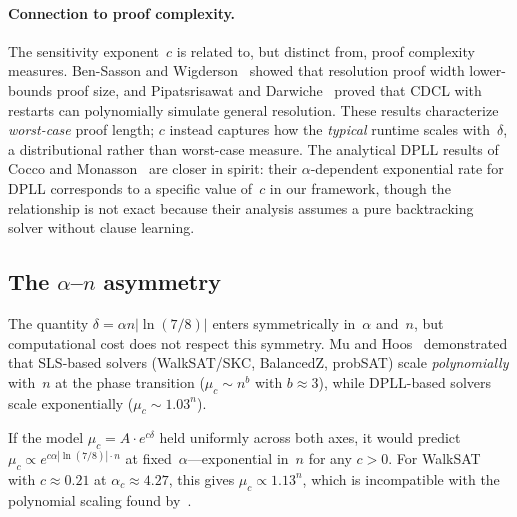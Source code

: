 \documentclass[11pt,a4paper]{article}
\newcommand{\mc}{\mu_c}
\begin{document}
\paragraph{Connection to proof complexity.}
The sensitivity exponent~$c$ is related to, but distinct from,
proof complexity measures.
Ben-Sasson and Wigderson~\cite{BenSasson2001} showed that
resolution proof width lower-bounds proof size,
and Pipatsrisawat and Darwiche~\cite{Pipatsrisawat2011}
proved that CDCL with restarts can polynomially simulate
general resolution.
These results characterize \emph{worst-case} proof length;
$c$ instead captures how the \emph{typical} runtime scales
with~$\delta$, a distributional rather than worst-case measure.
The analytical DPLL results of Cocco and
Monasson~\cite{CoccoMonasson2001} are closer in spirit:
their $\alpha$-dependent exponential rate for DPLL corresponds
to a specific value of~$c$ in our framework, though the
relationship is not exact because their analysis assumes
a pure backtracking solver without clause learning.

\subsection{The $\alpha$--$n$ asymmetry}
\label{sec:asymmetry}

The quantity $\delta = \alpha n |\!\ln(7/8)|$ enters symmetrically
in~$\alpha$ and~$n$, but computational cost does not respect
this symmetry.
Mu and Hoos~\cite{MuHoos2015} demonstrated that
SLS-based solvers (WalkSAT/SKC, BalancedZ, probSAT)
scale \emph{polynomially} with~$n$ at the phase transition
($\mu_c \sim n^b$ with $b \approx 3$), while DPLL-based solvers
scale exponentially ($\mu_c \sim 1.03^n$).

If the model $\mc = A \cdot e^{c\delta}$ held uniformly across
both axes, it would predict $\mc \propto e^{c \alpha |\ln(7/8)| \cdot n}$
at fixed~$\alpha$---exponential in~$n$ for any $c > 0$.
For WalkSAT with $c \approx 0.21$ at $\alpha_c \approx 4.27$,
this gives $\mc \propto 1.13^n$, which is incompatible with
the polynomial scaling found by~\cite{MuHoos2015}.
\end{document}
